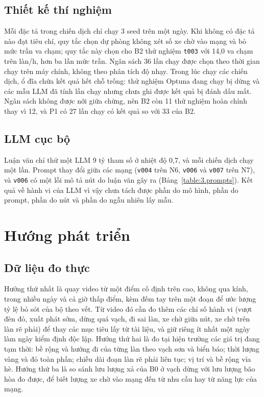 \documentclass[../main.tex]{subfiles}
\begin{document}
\subsection{Thiết kế thí nghiệm}

Mỗi đặc tả trong chiến dịch chỉ chạy 3 seed trên một ngày. Khi không có đặc tả nào đạt tiêu chí, quy tắc chọn dự phòng không xét số xe chờ vào mạng và bỏ mức trần va chạm; quy tắc này chọn cho B2 thử nghiệm \texttt{t003} với 14,0 va chạm trên làn/h, hơn ba lần mức trần. Ngân sách 36 lần chạy được chọn theo thời gian chạy trên máy chính, không theo phân tích độ nhạy. Trong lúc chạy các chiến dịch, ổ đĩa chứa kết quả hết chỗ trống: thử nghiệm Optuna đang chạy bị dừng và các mẫu LLM đã tính lần chạy nhưng chưa ghi được kết quả bị đánh dấu mất. Ngân sách không được nới giữa chừng, nên B2 còn 11 thử nghiệm hoàn chỉnh thay vì 12, và P1 có 27 lần chạy có kết quả so với 33 của B2.

\subsection{LLM cục bộ}

Luận văn chỉ thử một LLM 9 tỷ tham số ở nhiệt độ 0,7, và mỗi chiến dịch chạy một lần. Prompt thay đổi giữa các mạng (\texttt{v004} trên N6, \texttt{v006} và \texttt{v007} trên N7), và \texttt{v006} có một lỗi mô tả nút do luận văn gây ra (Bảng~\ref{table:3.prompts}). Kết quả về hành vi của LLM vì vậy chưa tách được phần do mô hình, phần do prompt, phần do nút và phần do ngẫu nhiên lấy mẫu.

\section{Hướng phát triển}

\subsection{Dữ liệu đo thực}

Hướng thứ nhất là quay video từ một điểm cố định trên cao, không qua kính, trong nhiều ngày và cả giờ thấp điểm, kèm đếm tay trên một đoạn để ước lượng tỷ lệ bỏ sót của bộ theo vết. Từ video đó cần đo thêm các chỉ số hành vi (vượt đèn đỏ, xuất phát sớm, dừng quá vạch, đi sai làn, xe chờ giữa nút, xe chờ trên làn rẽ phải) để thay các mục tiêu lấy từ tài liệu, và giữ riêng ít nhất một ngày làm ngày kiểm định độc lập. Hướng thứ hai là đo tại hiện trường các giá trị đang tạm thời: bề rộng và hướng đi của từng làn theo vạch sơn và biển báo; thời lượng vàng và đỏ toàn phần; chiều dài đoạn làn rẽ phải liên tục; vị trí và bề rộng vỉa hè. Hướng thứ ba là so sánh lưu lượng xả của B0 ở vạch dừng với lưu lượng bão hòa đo được, để biết lượng xe chờ vào mạng đến từ nhu cầu hay từ năng lực của mạng.
\end{document}
